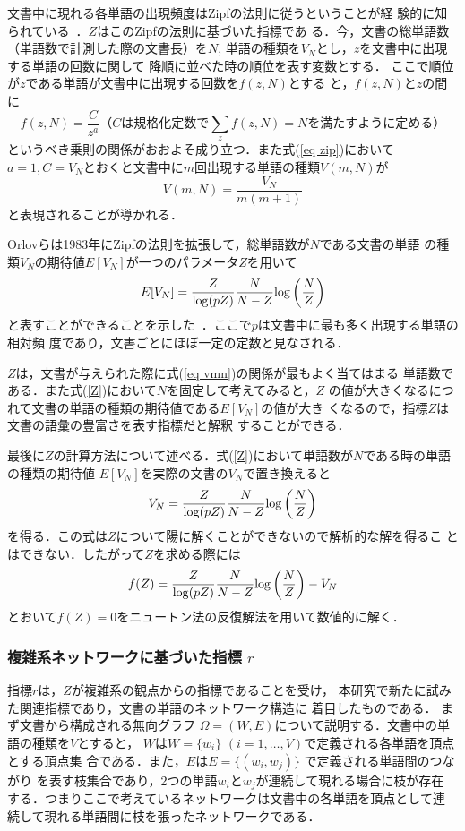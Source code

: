 \documentclass[japanese]{jnlp_JS2.0}
\begin{document}
文書中に現れる各単語の出現頻度はZipfの法則に従うということが経
  験的に知られている~\cite{Zipf}．$Z$はこのZipfの法則に基づいた指標であ
る．今，文書の総単語数（単語数で計測した際の文書長）を$N$, 
単語の種類を$V_N$とし，$z$を文書中に出現する単語の回数に関して
降順に並べた時の順位を表す変数とする．
ここで順位が$z$である単語が文書中に出現する回数を$f(z,N)$とする
と，$f(z,N)$と$z$の間に
\begin{equation}
f(z,N)=\frac{C}{z^a}  （Cは規格化定数で\sum_{z}f(z,N)=Nを満たすように
定める） 
\label{eq zip}
\end{equation}
というべき乗則の関係がおおよそ成り立つ．また式(\ref{eq zip})において
$a=1, C=V_N$とおくと文書中に$m$回出現する単語の種類$V(m,N)$が
\begin{equation}
V(m,N)=\frac{V_N}{m(m+1)} 
\label{eq vmn}
\end{equation}
と表現されることが導かれる．

Orlovらは1983年にZipfの法則を拡張して，総単語数が$N$である文書の単語
の種類$V_N$の期待値$E[V_N]$が一つのパラメータ$Z$を用いて
\begin{equation}
E[V_N] =  \frac{Z}{{\rm log}(pZ)}\frac{N}{N-Z}{\rm log}\left(\frac{N}{Z}\right) 
\label{Z}
\end{equation}
と表すことができることを示した~\cite{Orlov}．ここで$p$は文書中に最も多く出現する単語の相対頻
度であり，文書ごとにほぼ一定の定数と見なされる．

$Z$は，文書が与えられた際に式(\ref{eq vmn})の関係が最もよく当てはまる
単語数である．また式(\ref{Z})において$N$を固定して考えてみると，$Z$
の値が大きくなるにつれて文書の単語の種類の期待値である$E[V_N]$の値が大き
くなるので，指標$Z$は文書の語彙の豊富さを表す指標だと解釈
することができる．

最後に$Z$の計算方法について述べる．式(\ref{Z})において単語数が$N$である時の単語の種類の期待値
$E[V_N]$を実際の文書の$V_N$で置き換えると
\[
V_N=\frac{Z}{{\rm log}(pZ)}\frac{N}{N-Z}
{\rm log}\left(\frac{N}{Z}\right) 
\]
を得る．この式は$Z$について陽に解くことができないので解析的な解を得るこ
とはできない．したがって$Z$を求める際には
\[
f(Z)= \frac{Z}{{\rm log}(pZ)}\frac{N}{N-Z}{\rm log}\left(\frac{N}{Z}\right)-V_N
\]
とおいて$f(Z)=0$をニュートン法の反復解法を用いて数値的に解く．


\subsubsection*{複雑系ネットワークに基づいた指標 $r$}

指標$r$は，$Z$が複雑系の観点からの指標であることを受け，
本研究で新たに試みた関連指標であり，文書の単語のネットワーク構造に
着目したものである． まず文書から構成される無向グラフ
$\Omega=(W,E)$について説明する．文書中の単語の種類を$V$とすると，
$W$は$W=\{w_i\}$ $(i=1,\ldots ,V)$で定義される各単語を頂点とする頂点集
合である．また，$E$は$E=\{(w_i,w_j)\}$ で定義される単語間のつながり
を表す枝集合であり，2つの単語$w_i$と$w_j$が連続して現れる場合に枝が存在
する．つまりここで考えているネットワークは文書中の各単語を頂点として連
続して現れる単語間に枝を張ったネットワークである．
\end{document}
